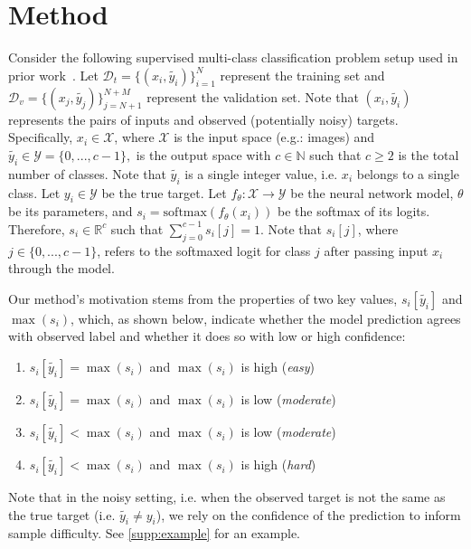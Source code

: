 \documentclass{article}
\theoremstyle{plain}
\theoremstyle{definition}
\theoremstyle{remark}
\begin{document}
\section{Method}
\label{sec:method}

Consider the following supervised multi-class classification problem setup used in prior work~\citep{northcutt_confident_2022}.
% 
Let $\mathcal{D}_{t} = \{(x_i, \widetilde{y_i})\}^N_{i=1}$ represent the training set and $\mathcal{D}_{v} = \{(x_j, \widetilde{y_j})\}^{N+M}_{j=N+1}$ represent the validation set. Note that $(x_i, \widetilde{y_i})$ represents the pairs of inputs and observed (potentially noisy) targets. Specifically, $x_i \in \mathcal{X}$, where $\mathcal{X}$ is the input space (e.g.: images) and $\widetilde{y_i} \in \mathcal{Y} = \{0,...,c-1\},$ is the output space with $c \in \mathbb{N}$ such that $c \ge 2$ is the total number of classes. Note that $\widetilde{y_i}$ is a single integer value, i.e. $x_i$ belongs to a single class. Let $y_i \in \mathcal{Y}$ be the true target. Let $f_{\theta}: \mathcal{X} \rightarrow \mathcal{Y}$ be the neural network model, $\theta$ be its parameters, and $s_i = \mathrm{softmax}(f_{\theta}(x_i))$ be the softmax of its logits. Therefore, $s_i \in \mathbb{R}^c$ such that $\sum_{j=0}^{c-1} s_i[j] = 1$. Note that $s_i[j]$, where $j \in \{0,...,c-1\}$, refers to the softmaxed logit for class $j$ after passing input $x_i$ through the model.

Our method's motivation stems from the properties of two key values, $s_i[\widetilde{y_i}]$ and $\max(s_i)$, which, as shown below, indicate whether the model prediction agrees with observed label and whether it does so with low or high confidence:
\vspace{-0.9em}
\begin{enumerate}[leftmargin=*,labelindent=0pt,label=\textbf{--}]
    \itemsep-0.3em 
    \item $s_i[\widetilde{y_i}] = \max(s_i)$ and $\max(s_i)$ is high (\textit{easy})
    \item $s_i[\widetilde{y_i}] = \max(s_i)$ and $\max(s_i)$ is low (\textit{moderate})
    \item $s_i[\widetilde{y_i}] < \max(s_i)$ and $\max(s_i)$ is low (\textit{moderate})
    \item $s_i[\widetilde{y_i}] < \max(s_i)$ and $\max(s_i)$ is high (\textit{hard})
\end{enumerate}

Note that in the noisy setting, i.e. when the observed target is not the same as the true target (i.e. $\widetilde{y_i} \neq y_i$), we rely on the confidence of the prediction to inform sample difficulty. See \ref{supp:example} for an example.
\end{document}
